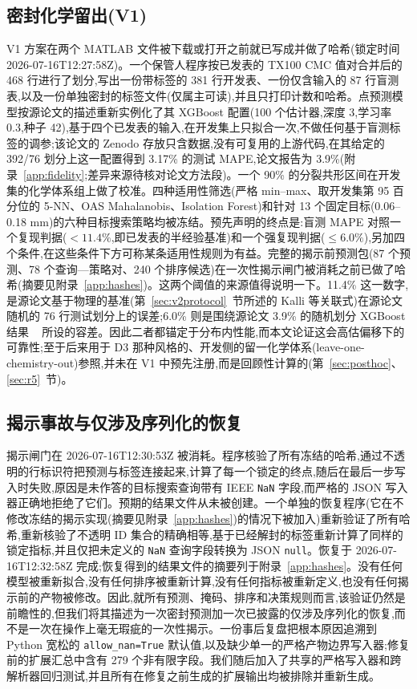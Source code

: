 \documentclass[11pt,a4paper]{ctexart}
\begin{document}
\subsection{密封化学留出(V1)}
\label{sec:v1protocol}

V1 方案在两个 MATLAB 文件被下载或打开之前就已写成并做了哈希(锁定时间 2026-07-16T12:27:58Z)。一个保管人程序按已发表的 TX100 CMC 值对合并后的 468 行进行了划分,写出一份带标签的 381 行开发表、一份仅含输入的 87 行盲测表,以及一份单独密封的标签文件(仅属主可读),并且只打印计数和哈希。点预测模型按源论文的描述重新实例化了其 XGBoost 配置(100 个估计器,深度 3,学习率 0.3,种子 42),基于四个已发表的输入,在开发集上只拟合一次,不做任何基于盲测标签的调参;该论文的 Zenodo 存放只含数据,没有可复用的上游代码,在其给定的 392/76 划分上这一配置得到 3.17\% 的测试 MAPE,论文报告为 3.9\%(附录~\ref{app:fidelity};差异来源待核对论文方法段)。一个 90\% 的分裂共形区间在开发集的化学体系组上做了校准。四种适用性筛选(严格 min–max、取开发集第 95 百分位的 5-NN、OAS Mahalanobis、Isolation Forest)和针对 13 个固定目标(0.06–0.18 mm)的六种目标搜索策略均被冻结。预先声明的终点是:盲测 MAPE 对照一个复现判据($<11.4\%$,即已发表的半经验基准)和一个强复现判据($\le 6.0\%$),另加四个条件,在这些条件下方可称某条适用性规则为有益。完整的揭示前预测包(87 个预测、78 个查询—策略对、240 个排序候选)在一次性揭示闸门被消耗之前已做了哈希(摘要见附录~\ref{app:hashes})。这两个阈值的来源值得说明一下。11.4\% 这一数字,是源论文基于物理的基准(第~\ref{sec:v2protocol}~节所述的 Kalli 等关联式)在源论文随机的 76 行测试划分上的误差;6.0\% 则是围绕源论文 3.9\% 的随机划分 XGBoost 结果 ~\cite{chagot2022} 所设的容差。因此二者都锚定于分布内性能,而本文论证这会高估偏移下的可靠性;至于后来用于 D3 那种风格的、开发侧的留一化学体系(leave-one-chemistry-out)参照,并未在 V1 中预先注册,而是回顾性计算的(第~\ref{sec:posthoc}、\ref{sec:r5}~节)。

\subsection{揭示事故与仅涉及序列化的恢复}
\label{sec:incident}

揭示闸门在 2026-07-16T12:30:53Z 被消耗。程序核验了所有冻结的哈希,通过不透明的行标识符把预测与标签连接起来,计算了每一个锁定的终点,随后在最后一步写入时失败,原因是未作答的目标搜索查询带有 IEEE \texttt{NaN} 字段,而严格的 JSON 写入器正确地拒绝了它们。预期的结果文件从未被创建。一个单独的恢复程序(它在不修改冻结的揭示实现(摘要见附录~\ref{app:hashes})的情况下被加入)重新验证了所有哈希,重新核验了不透明 ID 集合的精确相等,基于已经解封的标签重新计算了同样的锁定指标,并且仅把未定义的 \texttt{NaN} 查询字段转换为 JSON \texttt{null}。恢复于 2026-07-16T12:32:58Z 完成;恢复得到的结果文件的摘要列于附录~\ref{app:hashes}。没有任何模型被重新拟合,没有任何排序被重新计算,没有任何指标被重新定义,也没有任何揭示前的产物被修改。因此,就所有预测、掩码、排序和决策规则而言,该验证仍然是前瞻性的,但我们将其描述为一次密封预测加一次已披露的仅涉及序列化的恢复,而不是一次在操作上毫无瑕疵的一次性揭示。一份事后复盘把根本原因追溯到 Python 宽松的 \texttt{allow\_nan=True} 默认值,以及缺少单一的严格产物边界写入器;修复前的扩展汇总中含有 279 个非有限字段。我们随后加入了共享的严格写入器和跨解析器回归测试,并且所有在修复之前生成的扩展输出均被排除并重新生成。
\end{document}
